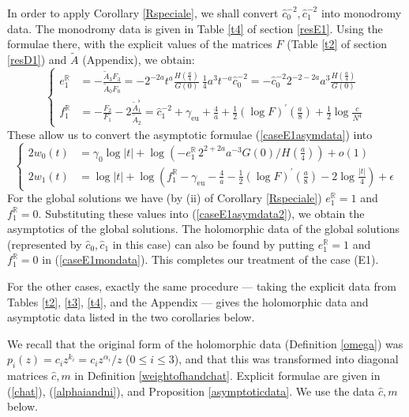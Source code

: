 \documentclass[a4paper,12pt,leqno]{amsart}
\numberwithin{equation}{section}
\theoremstyle{plain}
\theoremstyle{definition}
\newcommand{\R}{\mathbb R}
\newcommand{\al}{\alpha}
\newcommand{\ga}{\gamma}
\newcommand{\eps}{\epsilon}
\newcommand{\pr}{\prime}
\newcommand{\nn}{m}
\newcommand{\euler}{\gamma_{\scriptscriptstyle\text{eu}}}
\begin{document}
{In order to apply Corollary \ref{Rspeciale}, we shall convert 
$\hat c_0^{-2}, \hat c_1^{-2}$ into monodromy data.  The 
monodromy data is given in Table \ref{t4} of section \ref{resE1}. 
Using the formulae there, with the explicit values of the matrices $F$ 
(Table \ref{t2} of section \ref{resD1})
and $\tilde A$ (Appendix), we obtain:
\begin{equation}\label{caseE1mondata} 
\begin{cases}
e^\R_1& = -\frac{\tilde A_3 F_3}{\tilde A_0 F_0}
= -2^{-2a} t^a  \frac{ H(\frac a4) }{G(0)} \
\tfrac14 a^3 t^{-a} \hat c_0^{-2}
= - \hat c_0^{-2} 2^{-2-2a} a^3 \frac{ H(\frac a4) }{G(0)}
\\
f^\R_1& = - \frac{F_2}{F_1} - 2\frac{\tilde A_1^\flat}{\tilde A_2}
= \hat c_1^{-2} + \euler + \tfrac4a + \tfrac12 (\log F)^\pr(\tfrac a8) + \tfrac12 \log \tfrac{c}{N^4}
\end{cases}
\end{equation}
These allow us to convert the asymptotic  formulae (\ref{caseE1asymdata}) into
\begin{equation}\label{caseE1asymdata2}
\begin{cases}
2w_0(t) & \!\!\!=\! \ga_0 \log\vert t\vert + \log\left(
- e_1^\R\, 2^{2+2a} a^{-3} G(0)/H(\tfrac a4)
\right)
+o(1)
\\
2w_1(t) & \!\!\!=\! \log\vert t\vert \!+\! \log \left(
f_1^\R \!-\! \euler \!-\! \tfrac4a \!-\! \tfrac12 (\log F)^\pr(\tfrac a8)
 \!-\! 2\log\tfrac{\vert t\vert}{4}
\right)
\!
+
\!
\eps
\end{cases}
\end{equation}
For the global solutions we have (by (ii) of Corollary \ref{Rspeciale})  $e_1^\R=1$ and $f_1^\R=0$.  Substituting these values into (\ref{caseE1asymdata2}), we obtain the asymptotics of the global solutions.  The holomorphic data of 
the global solutions (represented by $\hat c_0,\hat c_1$ in this case) can also be found by putting $e_1^\R=1$ and $f_1^\R=0$ in (\ref{caseE1mondata}).  This completes our treatment of the case (E1).

For the other cases, exactly the same procedure --- taking the explicit data from Tables \ref{t2}, \ref{t3}, \ref{t4}, and the Appendix ---
gives the holomorphic data and asymptotic data listed in the two corollaries below.  

We recall that the original form of the holomorphic data (Definition \ref{omega}) was $p_i(z)=c_i z^{k_i}=c_i z^{\al_i}/z$ ($0\le i\le 3$), and that this was transformed into diagonal matrices $\hat c,\nn$ in Definition \ref{weightofhandchat}. Explicit formulae are given in
(\ref{chat}), (\ref{alphaiandni}), and Proposition \ref{asymptoticdata}. We use the data $\hat c,\nn$ below.

}
\end{document}
